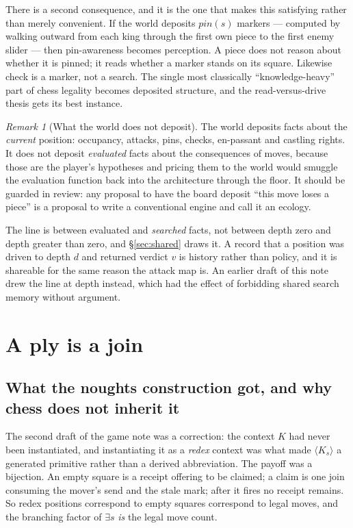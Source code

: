 \documentclass[11pt,a4paper]{article}
\theoremstyle{plain}
\theoremstyle{definition}
\theoremstyle{remark}
\newtheorem{remark}[theorem]{Remark}
\newcommand{\Kmod}[1]{\langle K_{#1}\rangle}
\begin{document}
There is a second consequence, and it is the one that makes this satisfying
rather than merely convenient. If the world deposits $\mathit{pin}(s)$ markers
--- computed by walking outward from each king through the first own piece to
the first enemy slider --- then pin-awareness becomes perception. A piece does
not reason about whether it is pinned; it reads whether a marker stands on its
square. Likewise check is a marker, not a search. The single most classically
``knowledge-heavy'' part of chess legality becomes deposited structure, and the
read-versus-drive thesis gets its best instance.

\begin{remark}[What the world does not deposit]
\label{rem:notdeposit}
The world deposits facts about the \emph{current} position: occupancy, attacks,
pins, checks, en-passant and castling rights. It does not deposit \emph{evaluated}
facts about the consequences of moves, because those are the player's hypotheses
and pricing them to the world would smuggle the evaluation function back into
the architecture through the floor. It should be guarded in review: any proposal
to have the board deposit ``this move loses a piece'' is a proposal to write a
conventional engine and call it an ecology.

The line is between evaluated and \emph{searched} facts, not between depth zero
and depth greater than zero, and \S\ref{sec:shared} draws it. A record that a
position was driven to depth $d$ and returned verdict $v$ is history rather than
policy, and it is shareable for the same reason the attack map is. An earlier
draft of this note drew the line at depth instead, which had the effect of
forbidding shared search memory without argument.
\end{remark}

\section{A ply is a join}
\label{sec:join}

\subsection{What the noughts construction got, and why chess does not inherit it}

The second draft of the game note was a correction: the context $K$ had never
been instantiated, and instantiating it as a \emph{redex} context was what made
$\Kmod{s}$ a generated primitive rather than a derived abbreviation. The payoff
was a bijection. An empty square is a receipt offering to be claimed; a claim is
one join consuming the mover's send and the stale mark; after it fires no
receipt remains. So redex positions correspond to empty squares correspond to
legal moves, and the branching factor of $\exists s$ \emph{is} the legal move
count.
\end{document}
